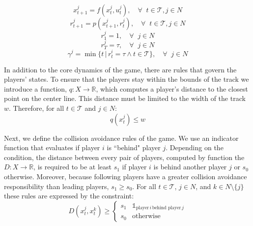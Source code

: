 \begin{equation} \label{eq:gen_dyn}
    x^j_{t+1} = f(x^j_t, u^j_t), \quad \forall \;\; t \in \mathcal{T}, j \in N
\end{equation}
\begin{equation} \label{eq:gen_idx_map}
    r^j_{t+1} = p(x^j_{t+1}, r^j_t), \quad \forall \;\; t \in \mathcal{T}, j \in N
\end{equation}
\begin{equation} \label{eq:gen_init_idx}
    r^j_{1} = 1, \quad \forall \;\; j \in N
\end{equation}
\begin{equation} \label{eq:gen_reach_goal}
    r^j_{T} = \tau, \quad \forall \;\; j \in N
\end{equation}
\begin{equation} \label{eq:gen_goal_time}
    \gamma^j = \min \{t \, | \, r^i_t = \tau \wedge t \in \mathcal{T} \}, \quad \forall \;\; j \in N
\end{equation}

In addition to the core dynamics of the game, there are rules that govern the players' states. To ensure that the players stay within the bounds of the track we introduce a function, $q: X \rightarrow \mathbb{R}$, which computes a player's distance to the closest point on the center line. This distance must be limited to the width of the track $w$. Therefore, for all $t \in \mathcal{T}$ and $j \in N$:
\begin{equation} \label{eq:gen_idx_dist}
    q(x^j_{t}) \leq w
\end{equation}

Next, we define the collision avoidance rules of the game. We use an indicator function that evaluates if player $i$ is ``behind" player $j$. Depending on the condition, the distance between every pair of players, computed by function the $D: X \rightarrow \mathbb{R}$, is required to be at least $s_1$ if player $i$ is behind another player $j$ or $s_0$ otherwise. Moreover, because following players have a greater collision avoidance responsibility than leading players, $s_1 \geq s_0$. For all $t \in \mathcal{T}$, $j \in N$, and $k \in N \setminus \{j\}$ these rules are expressed by the constraint:
\begin{equation} \label{eq:gen_coll_avoid}
    D(x^j_{t}, x^k_t) \geq  \begin{cases} s_1 & \mathds{1}_{\text{player} \, i \, \text{behind player}\,j} \\
    s_0 & \text{otherwise}  \end{cases}
\end{equation}

